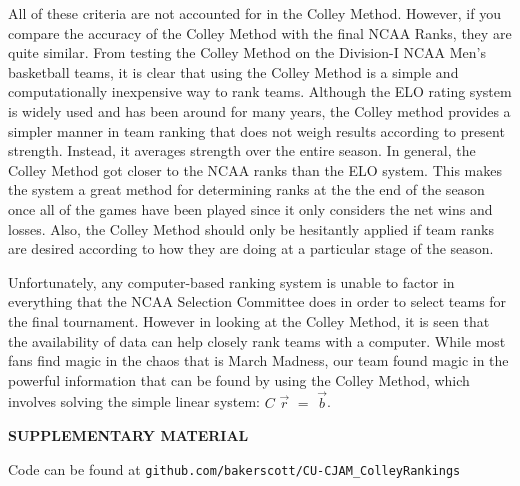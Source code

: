 \documentclass[12pt]{article}
\begin{document}
All of these criteria are not accounted for in the Colley Method. However, if you compare the accuracy of the Colley Method with the final NCAA Ranks, they are quite similar. From testing the Colley Method on the Division-I NCAA Men's basketball teams, it is clear that using the Colley Method is a simple and computationally inexpensive way to rank teams. Although the ELO rating system is widely used and has been around for many years, the Colley method provides a simpler manner in team ranking that does not weigh results according to present strength. Instead, it averages strength over the entire season. In general, the Colley Method got closer to the NCAA ranks than the ELO system. This makes the system a great method for determining ranks at the the end of the season once all of the games have been played since it only considers the net wins and losses. Also, the Colley Method should only be hesitantly applied if team ranks are desired according to how they are doing at a particular stage of the season.

Unfortunately, any computer-based ranking system is unable to factor in everything that the NCAA Selection Committee does in order to select teams for the final tournament. However in looking at the Colley Method, it is seen that the availability of data can help closely rank teams with a computer. While most fans find magic in the chaos that is March Madness, our team found magic in the powerful information that can be found by using the Colley Method, which involves solving the simple linear system: $C$ $\vec{r}$ $=$ $\vec{b}$.










\newpage

\begin{center}
{\large\bf SUPPLEMENTARY MATERIAL}
\end{center}

\begin{description}

\item Code can be found at \texttt{github.com/bakerscott/CU-CJAM\_ColleyRankings}

\end{description}

\bigskip
\end{document}
